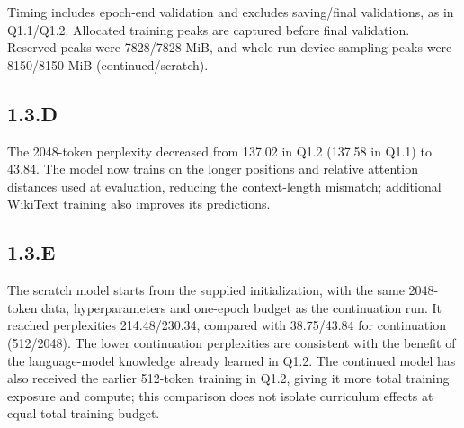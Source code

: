 \documentclass{article}
\begin{document}
Timing includes epoch-end validation and excludes saving/final validations, as in Q1.1/Q1.2. Allocated training peaks are captured before final validation. Reserved peaks were 7828/7828 MiB, and whole-run device sampling peaks were 8150/8150 MiB (continued/scratch).

\subsection*{1.3.D}
The 2048-token perplexity decreased from 137.02 in Q1.2 (137.58 in Q1.1) to 43.84. The model now trains on the longer positions and relative attention distances used at evaluation, reducing the context-length mismatch; additional WikiText training also improves its predictions.

\subsection*{1.3.E}
The scratch model starts from the supplied initialization, with the same 2048-token data, hyperparameters and one-epoch budget as the continuation run. It reached perplexities 214.48/230.34, compared with 38.75/43.84 for continuation (512/2048). The lower continuation perplexities are consistent with the benefit of the language-model knowledge already learned in Q1.2. The continued model has also received the earlier 512-token training in Q1.2, giving it more total training exposure and compute; this comparison does not isolate curriculum effects at equal total training budget.
\end{document}
